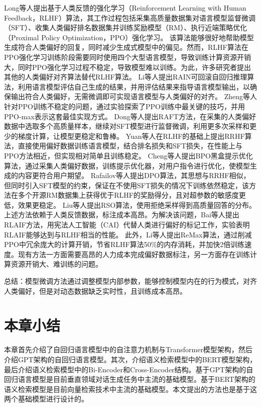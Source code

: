 Long等人\cite{DBLP:conf/nips/Ouyang0JAWMZASR22}提出基于人类反馈的强化学习（Reinforcement Learning with Human Feedback，RLHF）算法，其工作过程包括采集高质量数据集对语言模型监督微调（SFT）、收集人类偏好排名数据集并训练奖励模型（RM）、执行近端策略优化（Proximal Policy Optimization，PPO）强化学习。
该算法能够很好地帮助模型生成符合人类偏好的回复，同时减少生成式模型中的偏见。然而，RLHF算法在PPO强化学习训练阶段需要同时使用四个大型语言模型，导致训练计算资源开销大，同时PPO强化学习过程不稳定，导致模型难以训练。为此，许多研究者提出其他的人类偏好对齐算法替代RLHF算法。
Li等人\cite{DBLP:journals/corr/abs-2309-07124}提出RAIN可回滚自回归推理算法，利用语言模型评估自己生成的结果，并用评估结果来指导语言模型输出，以确保输出符合人类偏好，无需微调即可实现语言模型与人类偏好的对齐。
Zheng等人\cite{DBLP:journals/corr/abs-2307-04964}针对PPO训练不稳定的问题，通过实验探索了PPO训练中最关键的技巧，并用PPO-max表示这套最佳实现方式。
Dong等人\cite{DBLP:journals/corr/abs-2304-06767}提出RAFT方法，在采集的人类偏好数据中选取多个高质量样本，继续对SFT模型进行监督微调，利用更多次采样和更少的梯度计算，让模型更稳定和鲁棒。
Yuan等人\cite{DBLP:journals/corr/abs-2304-05302}在RLHF的基础上提出RRHF算法，直接使用偏好数据训练语言模型，结合排名损失和SFT损失，在性能上与PPO方法相近，但实现相对简单且训练稳定。
Cheng等人\cite{DBLP:journals/corr/abs-2311-04155}提出BPO黑盒提示优化算法，通过采集人类偏好数据，训练提示优化器，对用户指令进行优化，使模型生成的内容更符合用户期望。
Rafailov等人\cite{DBLP:conf/nips/RafailovSMMEF23}提出DPO算法，其思想与RRHF相似，但同时引入SFT模型的约束，保证在不使用SFT损失的情况下训练依然稳定，该方法在多个开源RM数据集上获得优于RLHF的奖励得分，且对超参数的敏感度更低，效果更稳定。
Liu等人\cite{DBLP:journals/corr/abs-2309-06657}提出RSO算法，使用拒绝采样得到高质量回答的分布。
上述方法依赖于人类反馈数据，标注成本高昂。为解决该问题，Bai等人\cite{DBLP:journals/corr/abs-2212-08073}提出RLAIF方法，用宪法人工智能（CAI）代替人类进行偏好的标记工作，实验表明RLAIF能够达到与RLHF相当的性能。
此外，Li等人\cite{DBLP:journals/corr/abs-2310-10505}提出ReMax算法，通过削减PPO中冗余庞大的计算开销，节省RLHF算法50\%的内存消耗，并加快2倍训练速度。现有方法一方面需要高昂的人力成本完成偏好数据标注，另一方面存在训练计算资源开销大、难训练的问题。

总结：模型微调方法通过调整模型内部参数，能够控制模型内在的行为模式，对齐人类偏好，但是对动态数据缺乏实时性，且训练成本高昂。

\section{本章小结}

本章首先介绍了自回归语言模型中的自注意力机制与Transformer模型架构，然后介绍GPT架构的自回归语言模型。其次，介绍语义检索模型中的BERT模型架构，最后介绍语义检索模型中的Bi-Encoder和Cross-Encoder结构。基于GPT架构的自回归语言模型是目前垂直领域对话生成任务中主流的基础模型。基于BERT架构的语义检索模型是目前向量检索技术中主流的基础模型。本文提出的方法也是基于这两个基础模型进行设计的。